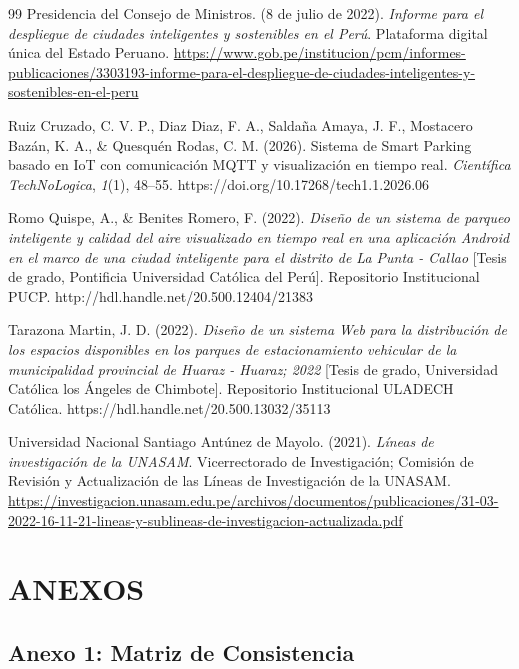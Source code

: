 \documentclass[12pt,a4paper]{article}
\begin{document}
\begin{thebibliography}{99}
	Presidencia del Consejo de Ministros. (8 de julio de 2022).
	\textit{Informe para el despliegue de ciudades inteligentes y sostenibles en el Perú}.
	Plataforma digital única del Estado Peruano.
	\url{https://www.gob.pe/institucion/pcm/informes-publicaciones/3303193-informe-para-el-despliegue-de-ciudades-inteligentes-y-sostenibles-en-el-peru}
	
	Ruiz Cruzado, C. V. P., Diaz Diaz, F. A., Saldaña Amaya, J. F., Mostacero Bazán, K. A., \& Quesquén Rodas, C. M. (2026).
	Sistema de Smart Parking basado en IoT con comunicación MQTT y visualización en tiempo real.
	\textit{Científica TechNoLogica}, \textit{1}(1), 48--55.
	https://doi.org/10.17268/tech1.1.2026.06
	
	Romo Quispe, A., \& Benites Romero, F. (2022).
	\textit{Diseño de un sistema de parqueo inteligente y calidad del aire visualizado en tiempo real en una aplicación Android en el marco de una ciudad inteligente para el distrito de La Punta - Callao}
	[Tesis de grado, Pontificia Universidad Católica del Perú].
	Repositorio Institucional PUCP.
	http://hdl.handle.net/20.500.12404/21383
	
	Tarazona Martin, J. D. (2022).
	\textit{Diseño de un sistema Web para la distribución de los espacios disponibles en los parques de estacionamiento vehicular de la municipalidad provincial de Huaraz - Huaraz; 2022}
	[Tesis de grado, Universidad Católica los Ángeles de Chimbote].
	Repositorio Institucional ULADECH Católica.
	https://hdl.handle.net/20.500.13032/35113
	
	Universidad Nacional Santiago Antúnez de Mayolo. (2021).
	\textit{Líneas de investigación de la UNASAM}.
	Vicerrectorado de Investigación; Comisión de Revisión y Actualización de las Líneas de Investigación de la UNASAM.
	\url{https://investigacion.unasam.edu.pe/archivos/documentos/publicaciones/31-03-2022-16-11-21-lineas-y-sublineas-de-investigacion-actualizada.pdf}
	
\end{thebibliography}

\clearpage
\section{ANEXOS}

\subsection{Anexo 1: Matriz de Consistencia}
\end{document}
